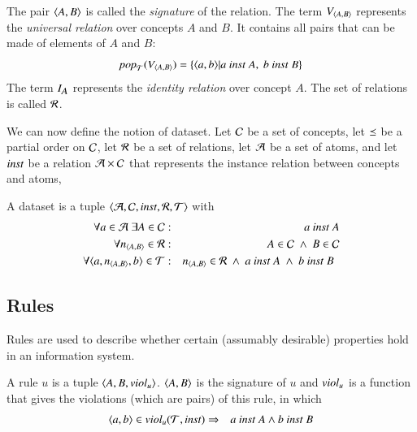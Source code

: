 \documentclass{elsarticle}
\begin{document}
   The pair $\langle{A},{B}\rangle$ is called the \emph{signature} of the relation.
   The term $V_{\langle{A},{B}\rangle}$ represents the \emph{universal relation} over concepts $A$ and $B$.
   It contains all pairs that can be made of elements of $A$ and $B$:
\[\text{\it pop\/}_{\mathcal{T}}(V_{\langle{A},{B}\rangle}) = \{ \langle{a},{b}\rangle| a\ \text{\it inst\/}\ A,\ b\ \text{\it inst\/}\ B \}\]
   The term $I_{\text{\it \small A\/}}$ represents the \emph{identity relation} over concept $A$.
   The set of relations is called $\mathcal{R}$.
   
   We can now define the notion of dataset.
   Let $\mathcal{C}$ be a set of concepts,
   let $\preceq$ be a partial order on $\mathcal{C}$,
   let $\mathcal{R}$ be a set of relations,
   let $\mathcal{A}$ be a set of atoms,
   and let $\text{\it inst\/}$ be a relation $\mathcal{A}\times\mathcal{C}$ that represents the instance relation between concepts and atoms,
\begin{definition}[dataset]
   \label{def:dataset}
   \item A dataset is a tuple $\langle\mathcal{A},\mathcal{C},\text{\it inst\/},\mathcal{R},\mathcal{T}\rangle$ with
   \begin{eqnarray}
      \forall a\in\atoms\ \exists A\in\concepts&:&a\ \inst\ A\\
      \forall \declare{n}{A}{B}\in\rels&:&A\in\concepts\ \wedge\ B\in\concepts\\
      \forall\triple{a}{\declare{n}{A}{B}}{b}\in\triples&:&\begin{array}[t]{@{}l}\declare{n}{A}{B}\in\rels\ \wedge\ a\ \inst\ A\ \wedge\ b\ \inst\ B\end{array}
   \end{eqnarray}
\end{definition}

\subsection{Rules}
\label{sct:Rules}
   Rules are used to describe whether certain (assumably desirable) properties hold in an information system.

\begin{definition}[rule]
   \label{def:rule}
   \item A rule $u$ is a tuple $\langle A,B,\text{\it viol\/}_u\rangle$.
   $\langle{A},{B}\rangle$ is the signature of $u$ and
   $\text{\it viol\/}_u$ is a function that gives the violations (which are pairs) of this rule,
   in which
\begin{eqnarray}
   \langle{a},{b}\rangle\in\text{\it viol\/}_{u}(\mathcal{T},\text{\it inst\/})&\Rightarrow&a\ \text{\it inst\/}\ A\wedge b\ \text{\it inst\/}\ B
\end{eqnarray}
\end{definition}
\end{document}
